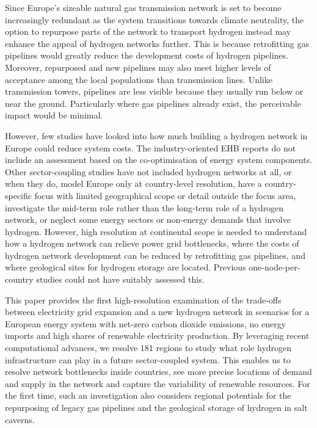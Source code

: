 Since Europe's sizeable natural gas transmission network is set to become
increasingly redundant as the system transitions towards climate neutrality, the
option to repurpose parts of the network to transport hydrogen instead may
enhance the appeal of hydrogen networks further. This is because retrofitting
gas pipelines would greatly reduce the development costs of hydrogen
pipelines.\cite{cerniauskasOptionsNatural2020,tsikliosHydrogenTransport2022}
Moreover, repurposed and new pipelines may also meet higher levels of acceptance
among the local populations than transmission
lines.\cite{schonauerHydrogenFuture2022} Unlike transmission towers, pipelines
are less visible because they usually run below or near the ground. Particularly
where gas pipelines already exist, the perceivable impact would be minimal.

However, few studies have looked into how much building a hydrogen network in
Europe could reduce system costs. The industry-oriented EHB reports do not
include an assessment based on the co-optimisation of energy system components.
\cite{gasforclimateEuropeanHydrogen2020,gasforclimateEuropeanHydrogen2021,gasforclimateExtendingEuropean2021,gasforclimateEuropeanHydrogen2022}
Other sector-coupling studies have not included hydrogen networks at all,
\cite{brownSynergiesSector2018,pickeringDiversityOptions2022,childFlexibleElectricity2019a,kendziorskiCentralizedDecentral2022a}
or when they do, model Europe only at country-level resolution,
\cite{europeancommission.directorategeneralforenergy.METISStudy2021,victoriaSpeedTechnological2022}
have a country-specific focus with limited geographical scope or detail outside
the focus area,\cite{gilsInteractionHydrogen2021} investigate the mid-term
role rather than the long-term role of a hydrogen
network,\cite{europeancommission.directorategeneralforenergy.METISStudy2021} or
neglect some energy sectors or non-energy demands that involve hydrogen.
\cite{gilsInteractionHydrogen2021,Caglayan2019,caglayanRobustDesign2021}
However, high resolution at continental scope is needed to understand how a
hydrogen network can relieve power grid bottlenecks, where the costs of hydrogen
network development can be reduced by retrofitting gas pipelines, and where
geological sites for hydrogen storage are located. Previous one-node-per-country
studies could not have suitably assessed this.

This paper provides the first high-resolution examination of the trade-offs
between electricity grid expansion and a new hydrogen network in scenarios for a
European energy system with net-zero carbon dioxide emissions, no energy imports
and high shares of renewable electricity production. By leveraging recent
computational advances, we resolve 181 regions to study what role hydrogen
infrastructure can play in a future sector-coupled system. This enables us to
resolve network bottlenecks inside countries, see more precise locations of
demand and supply in the network and capture the variability of renewable
resources. For the first time, such an investigation also considers regional
potentials for the repurposing of legacy gas pipelines and the geological
storage of hydrogen in salt caverns.

